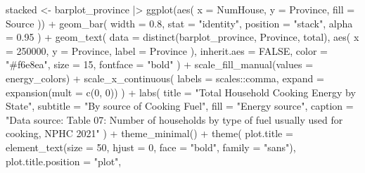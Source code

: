 \documentclass[
  letterpaper,
  DIV=11,
  numbers=noendperiod]{scrartcl}
\newenvironment{Shaded}{\begin{snugshade}}{\end{snugshade}}
\newcommand{\AttributeTok}[1]{\textcolor[rgb]{0.40,0.45,0.13}{#1}}
\newcommand{\ConstantTok}[1]{\textcolor[rgb]{0.56,0.35,0.01}{#1}}
\newcommand{\DecValTok}[1]{\textcolor[rgb]{0.68,0.00,0.00}{#1}}
\newcommand{\FloatTok}[1]{\textcolor[rgb]{0.68,0.00,0.00}{#1}}
\newcommand{\FunctionTok}[1]{\textcolor[rgb]{0.28,0.35,0.67}{#1}}
\newcommand{\NormalTok}[1]{\textcolor[rgb]{0.00,0.23,0.31}{#1}}
\newcommand{\OtherTok}[1]{\textcolor[rgb]{0.00,0.23,0.31}{#1}}
\newcommand{\SpecialCharTok}[1]{\textcolor[rgb]{0.37,0.37,0.37}{#1}}
\newcommand{\StringTok}[1]{\textcolor[rgb]{0.13,0.47,0.30}{#1}}
\begin{document}
\begin{Shaded}
\begin{Highlighting}[]
\NormalTok{stacked }\OtherTok{\textless{}{-}}\NormalTok{ barplot\_province }\SpecialCharTok{|\textgreater{}}
  \FunctionTok{ggplot}\NormalTok{(}\FunctionTok{aes}\NormalTok{(}
    \AttributeTok{x =}\NormalTok{ NumHouse,}
    \AttributeTok{y =}\NormalTok{ Province,}
    \AttributeTok{fill =}\NormalTok{ Source}
\NormalTok{  )) }\SpecialCharTok{+}
  \FunctionTok{geom\_bar}\NormalTok{(}
    \AttributeTok{width =} \FloatTok{0.8}\NormalTok{,}
    \AttributeTok{stat =} \StringTok{"identity"}\NormalTok{,}
    \AttributeTok{position =} \StringTok{"stack"}\NormalTok{,}
    \AttributeTok{alpha =} \FloatTok{0.95}
\NormalTok{  ) }\SpecialCharTok{+}
  \FunctionTok{geom\_text}\NormalTok{(}
    \AttributeTok{data =} \FunctionTok{distinct}\NormalTok{(barplot\_province, Province, total),}
    \FunctionTok{aes}\NormalTok{(}
      \AttributeTok{x =} \DecValTok{250000}\NormalTok{,}
      \AttributeTok{y =}\NormalTok{ Province,}
      \AttributeTok{label =}\NormalTok{ Province}
\NormalTok{    ),}
    \AttributeTok{inherit.aes =} \ConstantTok{FALSE}\NormalTok{,}
    \AttributeTok{color =} \StringTok{"\#f6e8ea"}\NormalTok{,}
   \AttributeTok{size =} \DecValTok{15}\NormalTok{,}
    \AttributeTok{fontface =} \StringTok{"bold"}
\NormalTok{  ) }\SpecialCharTok{+}
  \FunctionTok{scale\_fill\_manual}\NormalTok{(}\AttributeTok{values =}\NormalTok{ energy\_colors) }\SpecialCharTok{+}
  \FunctionTok{scale\_x\_continuous}\NormalTok{(}
    \AttributeTok{labels =}\NormalTok{ scales}\SpecialCharTok{::}\NormalTok{comma,}
    \AttributeTok{expand =} \FunctionTok{expansion}\NormalTok{(}\AttributeTok{mult =} \FunctionTok{c}\NormalTok{(}\DecValTok{0}\NormalTok{, }\DecValTok{0}\NormalTok{))}
\NormalTok{  ) }\SpecialCharTok{+}
  \FunctionTok{labs}\NormalTok{(}
    \AttributeTok{title =} \StringTok{"Total Household Cooking Energy by State"}\NormalTok{,}
    \AttributeTok{subtitle =} \StringTok{"By source of Cooking Fuel"}\NormalTok{,}
    \AttributeTok{fill =} \StringTok{"Energy source"}\NormalTok{,}
    \AttributeTok{caption =} \StringTok{"Data source: Table 07: Number of households by type of fuel usually used for cooking, NPHC 2021"}
\NormalTok{  ) }\SpecialCharTok{+}
  \FunctionTok{theme\_minimal}\NormalTok{() }\SpecialCharTok{+}
  \FunctionTok{theme}\NormalTok{(}
    \AttributeTok{plot.title =} \FunctionTok{element\_text}\NormalTok{(}\AttributeTok{size =} \DecValTok{50}\NormalTok{, }\AttributeTok{hjust =} \DecValTok{0}\NormalTok{, }\AttributeTok{face =} \StringTok{"bold"}\NormalTok{, }\AttributeTok{family =} \StringTok{"sans"}\NormalTok{),}
    \AttributeTok{plot.title.position =} \StringTok{"plot"}\NormalTok{,}

\end{Highlighting}
\end{Shaded}
\end{document}
